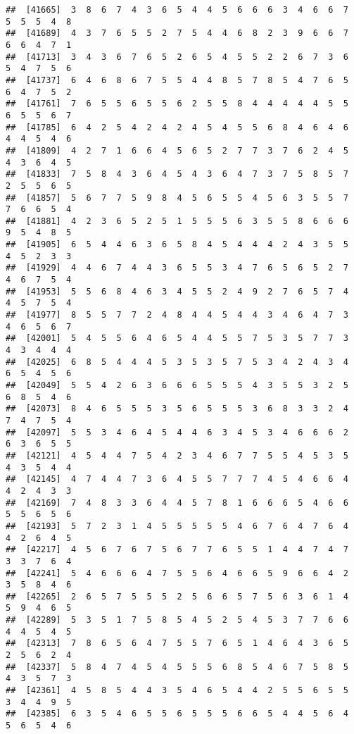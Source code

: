 \documentclass[
]{book}
\begin{document}
\begin{verbatim}
##  [41665]  3  8  6  7  4  3  6  5  4  4  5  6  6  6  3  4  6  6  7  5  5  5  4  8
##  [41689]  4  3  7  6  5  5  2  7  5  4  4  6  8  2  3  9  6  6  7  6  6  4  7  1
##  [41713]  3  4  3  6  7  6  5  2  6  5  4  5  5  2  2  6  7  3  6  5  4  7  5  6
##  [41737]  6  4  6  8  6  7  5  5  4  4  8  5  7  8  5  4  7  6  5  6  4  7  5  2
##  [41761]  7  6  5  5  6  5  5  6  2  5  5  8  4  4  4  4  4  5  5  6  5  5  6  7
##  [41785]  6  4  2  5  4  2  4  2  4  5  4  5  5  6  8  4  6  4  6  4  4  5  4  6
##  [41809]  4  2  7  1  6  6  4  5  6  5  2  7  7  3  7  6  2  4  5  4  3  6  4  5
##  [41833]  7  5  8  4  3  6  4  5  4  3  6  4  7  3  7  5  8  5  7  2  5  5  6  5
##  [41857]  5  6  7  7  5  9  8  4  5  6  5  5  4  5  6  3  5  5  7  7  6  6  5  4
##  [41881]  4  2  3  6  5  2  5  1  5  5  5  6  3  5  5  8  6  6  6  9  5  4  8  5
##  [41905]  6  5  4  4  6  3  6  5  8  4  5  4  4  4  2  4  3  5  5  4  5  2  3  3
##  [41929]  4  4  6  7  4  4  3  6  5  5  3  4  7  6  5  6  5  2  7  4  6  7  5  4
##  [41953]  5  5  6  8  4  6  3  4  5  5  2  4  9  2  7  6  5  7  4  4  5  7  5  4
##  [41977]  8  5  5  7  7  2  4  8  4  4  5  4  4  3  4  6  4  7  3  4  6  5  6  7
##  [42001]  5  4  5  5  6  4  6  5  4  4  5  5  7  5  3  5  7  7  3  4  3  4  4  4
##  [42025]  6  8  5  4  4  4  5  3  5  3  5  7  5  3  4  2  4  3  4  6  5  4  5  6
##  [42049]  5  5  4  2  6  3  6  6  6  5  5  5  4  3  5  5  3  2  5  6  8  5  4  6
##  [42073]  8  4  6  5  5  5  3  5  6  5  5  5  3  6  8  3  3  2  4  7  4  7  5  4
##  [42097]  5  5  3  4  6  4  5  4  4  6  3  4  5  3  4  6  6  6  2  6  3  6  5  5
##  [42121]  4  5  4  4  7  5  4  2  3  4  6  7  7  5  5  4  5  3  5  4  3  5  4  4
##  [42145]  4  7  4  4  7  3  6  4  5  5  7  7  7  4  5  4  6  6  4  4  2  4  3  3
##  [42169]  7  4  8  3  3  6  4  4  5  7  8  1  6  6  6  5  4  6  6  5  5  6  5  6
##  [42193]  5  7  2  3  1  4  5  5  5  5  5  4  6  7  6  4  7  6  4  4  2  6  4  5
##  [42217]  4  5  6  7  6  7  5  6  7  7  6  5  5  1  4  4  7  4  7  3  3  7  6  4
##  [42241]  5  4  6  6  6  4  7  5  5  6  4  6  6  5  9  6  6  4  2  3  5  8  4  6
##  [42265]  2  6  5  7  5  5  5  2  5  6  6  5  7  5  6  3  6  1  4  5  9  4  6  5
##  [42289]  5  3  5  1  7  5  8  5  4  5  2  5  4  5  3  7  7  6  6  4  4  5  4  5
##  [42313]  7  8  6  5  6  4  7  5  5  7  6  5  1  4  6  4  3  6  5  2  5  6  2  4
##  [42337]  5  8  4  7  4  5  4  5  5  5  6  8  5  4  6  7  5  8  5  4  3  5  7  3
##  [42361]  4  5  8  5  4  4  3  5  4  6  5  4  4  2  5  5  6  5  5  3  4  4  9  5
##  [42385]  6  3  5  4  6  5  5  6  5  5  5  6  6  5  4  4  5  6  4  5  6  5  4  6

\end{verbatim}
\end{document}

